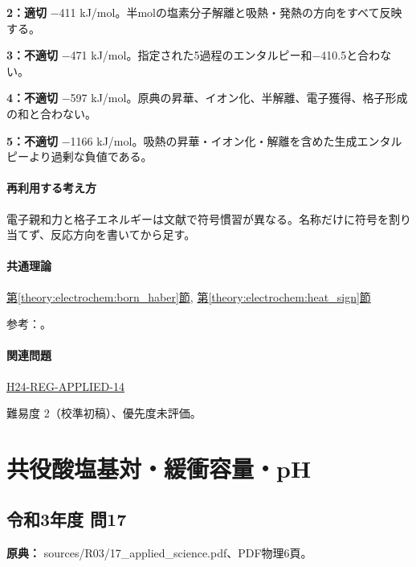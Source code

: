 \noindent\textbf{2：適切} −411 kJ/mol。半molの塩素分子解離と吸熱・発熱の方向をすべて反映する。\par

\noindent\textbf{3：不適切} −471 kJ/mol。指定された5過程のエンタルピー和−410.5と合わない。\par

\noindent\textbf{4：不適切} −597 kJ/mol。原典の昇華、イオン化、半解離、電子獲得、格子形成の和と合わない。\par

\noindent\textbf{5：不適切} −1166 kJ/mol。吸熱の昇華・イオン化・解離を含めた生成エンタルピーより過剰な負値である。\par

\paragraph{再利用する考え方} 電子親和力と格子エネルギーは文献で符号慣習が異なる。名称だけに符号を割り当てず、反応方向を書いてから足す。

\paragraph{共通理論} \hyperref[theory:electrochem:born_haber]{第\ref*{theory:electrochem:born_haber}節}, \hyperref[theory:electrochem:heat_sign]{第\ref*{theory:electrochem:heat_sign}節}

\par 参考：\cite{openstax_born_haber}。

\paragraph{関連問題} \hyperref[q:h24-reg-applied-14]{H24-REG-APPLIED-14}

\par 難易度 2（校準初稿）、優先度未評価。

\section{共役酸塩基対・緩衝容量・pH}

\subsection{令和3年度 問17}
\label{q:r03-reg-applied-17}

\noindent\textbf{原典：} sources/R03/17\_applied\_science.pdf、PDF物理6頁。


